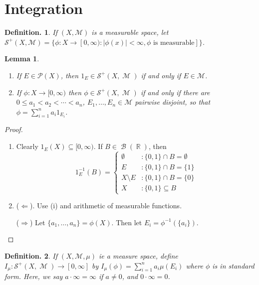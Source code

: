 \documentclass[12pt, a4paper]{memoir}
\DeclareMathOperator{\R}{{\mathbb{R}}}
\newtheorem{lemma}[theorem]{Lemma}
\theoremstyle{nonumberplain}
\newtheorem{definition}{Definition.}
\newtheorem{proof}{Proof}
\DeclareMathOperator{\M}{\mathcal{M}}
\DeclareMathOperator{\B}{\mathcal{B}}
\begin{document}
\section{Integration}
\begin{definition}
    If $(X,\mathcal{M})$ is a measurable space, let $\mathcal{S}^+(X,\mathcal{M})=\{\phi:X\to[0,\infty):|\phi(x)|<\infty,\phi\text{ is measurable}]\}$.
\end{definition}
\begin{lemma}
    \begin{enumerate}[nolistsep, label=(\roman*)]
        \item If $E\in\mathcal{P}(X)$, then $1_E\in\mathcal{S}^+(X,\M)$ if and only if $E\in\mathcal{M}$. %
        \item If $\phi:X\to[0,\infty)$ then $\phi\in\mathcal{S}^+(X,\M)$ if and only if there are $0\leq a_1<a_2<\cdots<a_n$, $E_1,\ldots,E_n\in\mathcal{M}$ pairwise disjoint, so that $\phi=\sum_{i=1}^n a_i 1_{E_i}$.
    \end{enumerate}
\end{lemma}
\begin{proof}
    \begin{enumerate}[nolistsep, label=(\roman*)]
        \item Clearly $1_E(X)\subseteq[0,\infty)$. %
            If $B\in\B(\R)$, then
            \begin{equation*}
                1_E^{-1}(B)=\begin{cases}
                    \emptyset&:\{0,1\}\cap B=\emptyset\\
                    E&:\{0,1\}\cap B=\{1\}\\
                    X\setminus E&:\{0,1\}\cap B=\{0\}\\
                    X&:\{0,1\}\subseteq B
                \end{cases}
            \end{equation*}
        \item ($\Leftarrow$).
            Use (i) and arithmetic of measurable functions.

            ($\Rightarrow$) Let $\{a_1,\ldots,a_n\}=\phi(X)$.
            Then let $E_i=\phi^{-1}(\{a_i\})$.
    \end{enumerate}
\end{proof}
\begin{definition}
    If $(X,\mathcal{M},\mu)$ ie a measure space, define $I_\mu:\mathcal{S}^+(X,\M)\to[0,\infty]$ by $I_\mu(\phi)=\sum_{i=1}^n a_i\mu(E_i)$ where $\phi$ is in standard form.
    Here, we say $a\cdot\infty=\infty$ if $a\neq 0$, and $0\cdot\infty=0$.
\end{definition}
\end{document}
